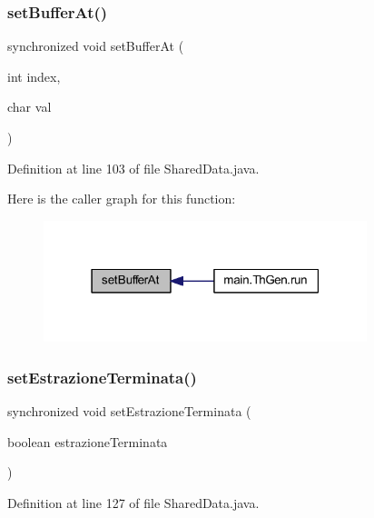 \subsubsection{\texorpdfstring{set\+Buffer\+At()}{setBufferAt()}}
{\footnotesize\ttfamily synchronized void set\+Buffer\+At (\begin{DoxyParamCaption}\item[{int}]{index,  }\item[{char}]{val }\end{DoxyParamCaption})}



Definition at line 103 of file Shared\+Data.\+java.

Here is the caller graph for this function\+:
\nopagebreak
\begin{figure}[H]
\begin{center}
\leavevmode
\includegraphics[width=267pt]{classmain_1_1_shared_data_a72a099def4ea0fd3499ed5b33a493245_icgraph}
\end{center}
\end{figure}
\mbox{\label{classmain_1_1_shared_data_a7e4be6ed2e568675410bd1666d4bad43}} 
\subsubsection{\texorpdfstring{set\+Estrazione\+Terminata()}{setEstrazioneTerminata()}}
{\footnotesize\ttfamily synchronized void set\+Estrazione\+Terminata (\begin{DoxyParamCaption}\item[{boolean}]{estrazione\+Terminata }\end{DoxyParamCaption})}



Definition at line 127 of file Shared\+Data.\+java.

